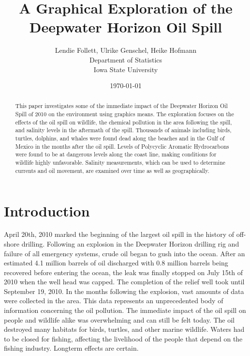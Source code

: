 \documentclass[authoryear,12pt]{elsarticle}
\title{ A Graphical Exploration of the Deepwater Horizon Oil Spill}
\author{Lendie Follett, Ulrike Genschel, Heike Hofmann\\Department of Statistics\\Iowa State University}
\date{\today}                                           %
\begin{document}
\begin{abstract}

This paper investigates some of the  immediate impact of the Deepwater Horizon Oil Spill of 2010 on the environment using graphics means. The exploration focuses on the effects of the oil spill on wildlife, the chemical pollution in the area following the spill, and salinity levels in the aftermath of the spill.
Thousands of animals including birds, turtles, dolphins, and whales were found dead along the beaches and in the Gulf of Mexico in the months after the oil spill. Levels of Polycyclic Aromatic Hydrocarbons were found to be at dangerous levels along the coast line, making conditions for wildlife highly unfavorable. Salinity measurements, which can be used to determine currents and oil movement, are examined over time as well as geographically. 
\end{abstract}

\maketitle

\section{Introduction}
April 20th, 2010 marked the beginning of the largest oil spill in the history of off-shore drilling.  Following an explosion in the Deepwater Horizon drilling rig and failure of all emergency systems, crude oil began to gush into the ocean.  After an estimated 4.1 million barrels of oil discharged with 0.8 million barrels being recovered before entering the ocean, the leak was finally stopped on July 15th of 2010 when the well head was capped.  The completion of the relief well took until September 19, 2010.  In the months following the explosion, vast amounts of data were collected in the area. This data represents an unprecedented body of information concerning the oil pollution. The immediate impact of the oil spill on people and wildlife alike was overwhelming and can still be felt today.  The oil destroyed many habitats for birds, turtles, and other marine wildlife.  Waters had to be closed for fishing, affecting the livelihood of the people that depend on the fishing industry. Longterm effects are certain. \\
\end{document}
